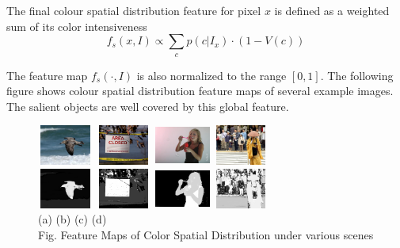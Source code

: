 \documentclass[10pt,twocolumn,letterpaper]{article}
\newcommand{\SUM}{\sum\limits}
\newcommand{\hs}{\hspace{0.58in}}
\begin{document}
The final colour spatial distribution feature for pixel $x$ is defined as a weighted sum of its color intensiveness $$f_s(x,I)\propto\SUM_c p(c|I_x)\cdot(1-V(c))$$

The feature map $f_s (\cdot,I)$ is also normalized to the range $[0, 1]$. The following figure shows colour spatial distribution feature maps of several example images. The salient objects are well covered by this global feature. 

\begin{figure}
    \begin{center}
    \includegraphics[width=0.72in,height=0.52in]{./CSD_image/1.jpg}
    \includegraphics[width=0.72in,height=0.52in]{./CSD_image/2.jpg}
    \includegraphics[width=0.72in,height=0.52in]{./CSD_image/3.jpg}
    \includegraphics[width=0.72in,height=0.52in]{./CSD_image/4.jpg}\\
    \includegraphics[width=0.72in,height=0.52in]{./CSD_image/1_CSD.jpg}
    \includegraphics[width=0.72in,height=0.52in]{./CSD_image/2_CSD.jpg}
    \includegraphics[width=0.72in,height=0.52in]{./CSD_image/3_CSD.jpg} 
    \includegraphics[width=0.72in,height=0.52in]{./CSD_image/4_CSD.jpg} \\
    \footnotesize \hspace{0.1cm} (a) \hs (b) \hs  (c) \hs (d) \\
     Fig. Feature Maps of Color Spatial Distribution under various scenes
    \end{center}
\end{figure}
\end{document}
